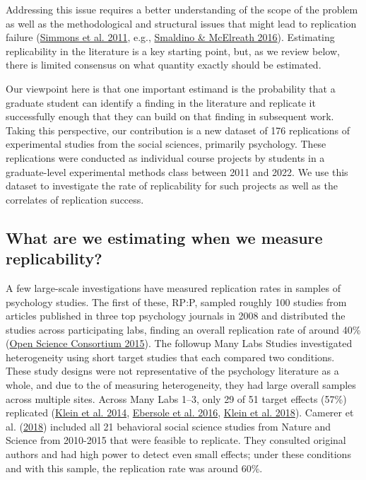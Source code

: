 \documentclass[
  english,
  a4paper,
]{article}
\begin{document}
Addressing this issue requires a better understanding of the scope of the problem as well as the methodological and structural issues that might lead to replication failure (\protect\hyperlink{ref-simmons2011}{Simmons et al. 2011}, e.g., \protect\hyperlink{ref-smaldino2016}{Smaldino \& McElreath 2016}). Estimating replicability in the literature is a key starting point, but, as we review below, there is limited consensus on what quantity exactly should be estimated.

Our viewpoint here is that one important estimand is the probability that a graduate student can identify a finding in the literature and replicate it successfully enough that they can build on that finding in subsequent work. Taking this perspective, our contribution is a new dataset of 176 replications of experimental studies from the social sciences, primarily psychology. These replications were conducted as individual course projects by students in a graduate-level experimental methods class between 2011 and 2022. We use this dataset to investigate the rate of replicability for such projects as well as the correlates of replication success.

\hypertarget{what-are-we-estimating-when-we-measure-replicability}{%
\subsection{What are we estimating when we measure replicability?}\label{what-are-we-estimating-when-we-measure-replicability}}

A few large-scale investigations have measured replication rates in samples of psychology studies. The first of these, RP:P, sampled roughly 100 studies from articles published in three top psychology journals in 2008 and distributed the studies across participating labs, finding an overall replication rate of around 40\% (\protect\hyperlink{ref-openscienceconsortium2015}{Open Science Consortium 2015}). The followup Many Labs Studies investigated heterogeneity using short target studies that each compared two conditions. These study designs were not representative of the psychology literature as a whole, and due to the of measuring heterogeneity, they had large overall samples across multiple sites. Across Many Labs 1--3, only 29 of 51 target effects (57\%) replicated (\protect\hyperlink{ref-klein2014}{Klein et al. 2014}, \protect\hyperlink{ref-ebersole2016}{Ebersole et al. 2016}, \protect\hyperlink{ref-klein2018}{Klein et al. 2018}). Camerer et al. (\protect\hyperlink{ref-camerer2018}{2018}) included all 21 behavioral social science studies from Nature and Science from 2010-2015 that were feasible to replicate. They consulted original authors and had high power to detect even small effects; under these conditions and with this sample, the replication rate was around 60\%.
\end{document}
